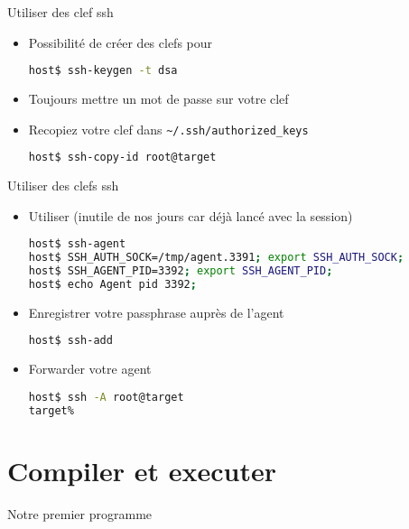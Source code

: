 \begin{frame}[fragile=singleslide]{Utiliser des clef ssh}
  \begin{itemize}
  \item Possibilité de créer des clefs pour 
\begin{lstlisting}[language=sh]
host$ ssh-keygen -t dsa
\end{lstlisting} %
  \item Toujours mettre un mot de passe sur votre clef
  \item Recopiez votre clef dans \verb+~/.ssh/authorized_keys+
\begin{lstlisting}[language=sh]
host$ ssh-copy-id root@target
\end{lstlisting} %
  \end{itemize}
\end{frame}

\begin{frame}[fragile=singleslide]{Utiliser des clefs ssh}
  \begin{itemize}
  \item Utiliser  (inutile de nos jours car déjà lancé avec la session)
\begin{lstlisting}[language=sh]
host$ ssh-agent
host$ SSH_AUTH_SOCK=/tmp/agent.3391; export SSH_AUTH_SOCK;
host$ SSH_AGENT_PID=3392; export SSH_AGENT_PID;
host$ echo Agent pid 3392;
\end{lstlisting} %
  \item Enregistrer votre passphrase auprès de l'agent
\begin{lstlisting}[language=sh]
host$ ssh-add
\end{lstlisting} %
  \item Forwarder votre agent
\begin{lstlisting}[language=sh]
host$ ssh -A root@target
target%
\end{lstlisting} %
  \end{itemize}
\end{frame}


\section{Compiler et executer}

\begin{frame}[fragile=singleslide]{Notre premier programme}{}
  
\end{frame}

